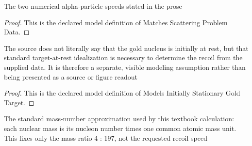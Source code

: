\begin{definition}
  \label{def:physics:phyx-mini-0641:phyxminiproblems-problemphyxmini0641-matchesscatteringproblemdata}
  The two numerical alpha-particle speeds stated in the prose
\end{definition}
\begin{proof}
  This is the declared model definition of Matches Scattering Problem Data.
\end{proof}
\begin{definition}
  \label{def:physics:phyx-mini-0641:phyxminiproblems-problemphyxmini0641-modelsinitiallystationarygoldtarget}
  The source does not literally say that the gold nucleus is initially at rest, but that standard target-at-rest idealization is necessary to determine the recoil from the supplied data. It is therefore a separate, visible modeling assumption rather than being presented as a source or figure readout
\end{definition}
\begin{proof}
  This is the declared model definition of Models Initially Stationary Gold Target.
\end{proof}
\begin{definition}
  \label{def:physics:phyx-mini-0641:phyxminiproblems-problemphyxmini0641-usesmassnumberapproximation}
  The standard mass-number approximation used by this textbook calculation: each nuclear mass is its nucleon number times one common atomic mass unit. This fixes only the mass ratio 4 : 197, not the requested recoil speed
\end{definition}
